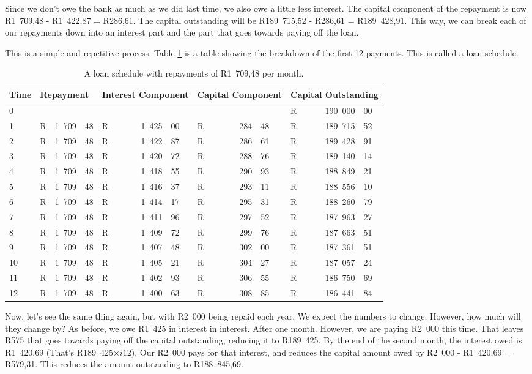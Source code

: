 Since we don't owe the bank as much as we did last time, we also owe a little less interest. The capital component of the repayment is now R1~709,48 - R1~422,87 = R286,61. The capital outstanding will be R189~715,52 - R286,61 = R189~428,91. This way, we can break each of our repayments down into an interest part and the part that goes towards paying off the loan.

This is a simple and repetitive process. Table \ref{tb:lschedule1} is a table showing the breakdown of the first 12 payments. This is called a loan schedule.

\begin{table}
\begin{center}
\begin{tabular}{|l|lr@{,}l|lr@{,}l|lr@{,}l|lr@{,}l|}
\hline
Time&\multicolumn{3}{l|}{Repayment}&\multicolumn{3}{p{2cm}|}{Interest Component}&\multicolumn{3}{p{2cm}|}{Capital Component}&\multicolumn{3}{p{2.5cm}|}{Capital Outstanding}\\
\hline
\hline
0&\multicolumn{3}{l|}{}&\multicolumn{3}{r|}{}&\multicolumn{3}{r|}{}&R&190~000&00\\
1&R&1~709&48&R&1~425&00&R&284&48&R&189~715&52\\
2&R&1~709&48&R&1~422&87&R&286&61&R&189~428&91\\
3&R&1~709&48&R&1~420&72&R&288&76&R&189~140&14\\
4&R&1~709&48&R&1~418&55&R&290&93&R&188~849&21\\
5&R&1~709&48&R&1~416&37&R&293&11&R&188~556&10\\
6&R&1~709&48&R&1~414&17&R&295&31&R&188~260&79\\
7&R&1~709&48&R&1~411&96&R&297&52&R&187~963&27\\
8&R&1~709&48&R&1~409&72&R&299&76&R&187~663&51\\
9&R&1~709&48&R&1~407&48&R&302&00&R&187~361&51\\
10&R&1~709&48&R&1~405&21&R&304&27&R&187~057&24\\
11&R&1~709&48&R&1~402&93&R&306&55&R&186~750&69\\
12&R&1~709&48&R&1~400&63&R&308&85&R&186~441&84\\

\hline
\end{tabular}
\end{center}
\caption{A loan schedule with repayments of R1~709,48 per month.}
\label{tb:lschedule1}
\end{table}

Now, let's see the same thing again, but with R2~000 being repaid each year. We expect the numbers to change. However, how much will they change by? As before, we owe R1~425 in interest in interest. After one month. However, we are paying R2~000 this time. That leaves R575 that goes towards paying off the capital outstanding, reducing it to R189~425. By the end of the second month, the interest owed is R1~420,69 (That's R189~425$\times i12$). Our R2~000 pays for that interest, and reduces the capital amount owed by R2~000 - R1~420,69 = R579,31. This reduces the amount outstanding to R188~845,69.

